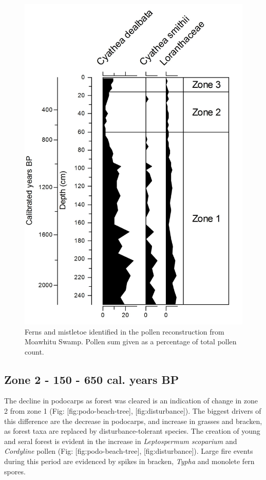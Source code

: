 \begin{figure}
\centering
\includegraphics{ferns-zone.jpg}
\caption{Ferns and mistletoe identified in the pollen reconstruction
from Moawhitu Swamp. Pollen sum given as a percentage of total pollen
count.{}}
\end{figure}

\subsection{Zone 2 - 150 - 650 cal. years
BP}\label{zone-2---150---650-cal.-years-bp}

The decline in podocarps as forest was cleared is an indication of
change in zone 2 from zone 1 (Fig: {[}fig:podo-beach-tree{]},
{[}fig:disturbance{]}). The biggest drivers of this difference are the
decrease in podocarps, and increase in grasses and bracken, as forest
taxa are replaced by disturbance-tolerant species. The creation of young
and seral forest is evident in the increase in \emph{Leptospermum
scoparium} and \emph{Cordyline} pollen (Fig: {[}fig:podo-beach-tree{]},
{[}fig:disturbance{]}). Large fire events during this period are
evidenced by spikes in bracken, \emph{Typha} and monolete fern spores.

